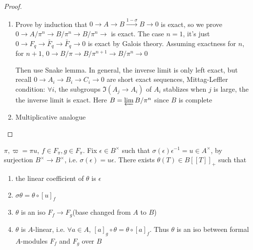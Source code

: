 \documentclass[main]{subfiles}
\begin{document}
\begin{proof}
\begin{enumerate}
\item Prove by induction that  $0\to A\to B\xrightarrow{1-\sigma}B\to0$ is exact, so we prove $0\to A/\pi^n\to B/\pi^n\to B/\pi^n\to$ is exact. The case $n=1$, it's just  $0\to F_q\to \bar F_q\to \bar F_q\to0$ is exact by Galois theory. Assuming exactness for $n$, for $n+1$, $0\to B/\pi\to B/\pi^{n+1}\to B/\pi^n\to0$
\begin{center}
\end{center}
Then use Snake lemma. In general, the inverse limit is only left exact, but recall
$0\to A_i\to B_i\to C_i\to0$ are short exact sequences, Mittag-Leffler condition: $\forall i$, the subgroups $\Im(A_j\to A_i)$ of $A_i$ stablizes when $j$ is large, the the inverse limit is exact. Here $B=\varprojlim B/\pi^n$ since $B$ is complete
\item Multiplicative analogue
\end{enumerate}
\end{proof}

\begin{proposition}
$\pi,\varpi=\pi u$, $f\in F_\pi,g\in F_\pi$. Fix $\epsilon\in B^\times$ such that $\sigma(\epsilon)\epsilon^{-1}=u\in A^\times$, by surjection $B^\times\to B^\times$, i.e. $\sigma(\epsilon)=u\epsilon$. There exists $\theta(T)\in B[[T]]_+$ such that
\begin{enumerate}
\item the linear coefficient of $\theta$ is $\epsilon$
\item $\sigma\theta=\theta\circ [u]_f$
\item $\theta$ is an iso $F_f\to F_g$(base changed from $A$ to $B$)
\item $\theta$ is $A$-linear, i.e. $\forall a\in A$, $[a]_g\circ\theta=\theta\circ[a]_f$. Thus $\theta$ is an iso between formal $A$-modules $F_f$ and $F_g$ over $B$
\end{enumerate}
\end{proposition}
\end{document}
